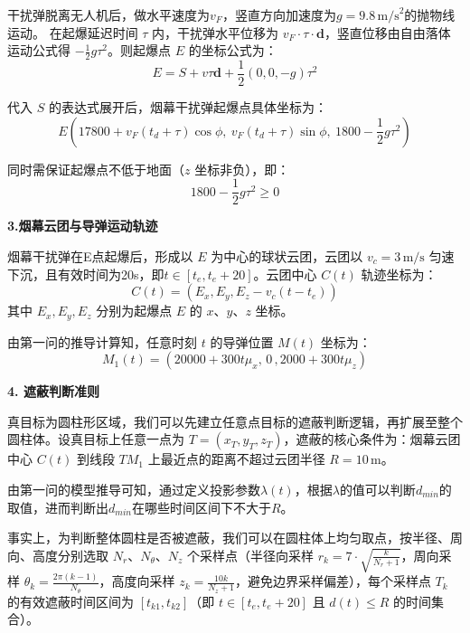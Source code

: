 \documentclass[withoutpreface]{cumcmthesis}
\begin{document}
干扰弹脱离无人机后，做水平速度为$v_F$，竖直方向加速度为$g = 9.8 \, \text{m/s}^2$的抛物线运动。
在起爆延迟时间 $\tau$ 内，干扰弹水平位移为 $v_F \cdot \tau \cdot \mathbf{d}$，竖直位移由自由落体运动公式得 $-\frac{1}{2} g \tau^2$。则起爆点 $E$ 的坐标公式为：
\begin{equation}
    E = S + v  \tau  \mathbf{d} + \frac{1}{2} (0, 0, -g) \tau^2 
\end{equation}


代入 $S$ 的表达式展开后，烟幕干扰弹起爆点具体坐标为：
\begin{equation}
    E\left( 17800 + v_F (t_d + \tau) \cos\phi,\  v_F (t_d + \tau) \sin\phi,\  1800 - \frac{1}{2} g \tau^2 \right)
\end{equation}

同时需保证起爆点不低于地面（$z$ 坐标非负），即：
\begin{equation}
    1800 - \frac{1}{2} g \tau^2 \geq 0
\end{equation}

\textbf{3.烟幕云团与导弹运动轨迹}

烟幕干扰弹在E点起爆后，形成以 $E$ 为中心的球状云团，云团以 $v_c = 3 \, \text{m/s}$ 匀速下沉，且有效时间为20s，即$t \in [t_e, t_e + 20]$。云团中心 $C(t)$ 轨迹坐标为：
\begin{equation}
    C(t) = \left( E_x, E_y, E_z - v_c (t - t_e) \right)
\end{equation}
其中 $E_x, E_y, E_z$ 分别为起爆点 $E$ 的 $x$、$y$、$z$ 坐标。

由第一问的推导计算知，任意时刻 $t$ 的导弹位置 $M(t)$ 坐标为：
\begin{equation}
 M_1(t)=(20000+300t\mu _x,\, 0\, ,2000+300t\mu _z)   
\end{equation}

\textbf{4. 遮蔽判断准则}

真目标为圆柱形区域，我们可以先建立任意点目标的遮蔽判断逻辑，再扩展至整个圆柱体。设真目标上任意一点为 $T = (x_T, y_T, z_T)$，遮蔽的核心条件为：烟幕云团中心 $C(t)$ 到线段 $TM_1$ 上最近点的距离不超过云团半径 $R = 10 \, \text{m}$。

由第一问的模型推导可知，通过定义投影参数$\lambda(t) $，根据$\lambda $的值可以判断$d_{min}$的取值，进而判断出$d_{min}$在哪些时间区间下不大于$R$。

事实上，为判断整体圆柱是否被遮蔽，我们可以在圆柱体上均匀取点，按半径、周向、高度分别选取 $N_r$、$N_\theta$、$N_z$ 个采样点（半径向采样 $r_k = 7 \cdot \sqrt{\frac{k}{N_r + 1}}$，周向采样 $\theta_k = \frac{2\pi (k-1)}{N_\theta}$，高度向采样 $z_k = \frac{10 k}{N_z + 1}$，避免边界采样偏差），每个采样点 $T_k$ 的有效遮蔽时间区间为 $[t_{k1}, t_{k2}]$（即 $t \in [t_e, t_e + 20]$ 且 $d(t) \leq R$ 的时间集合）。
\end{document}
